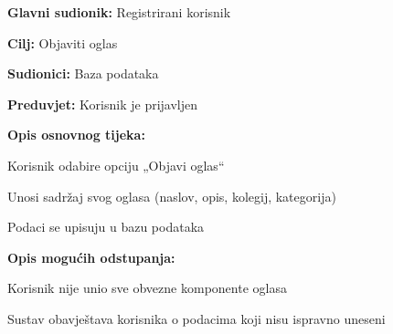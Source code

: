 				
					\noindent {}
					\begin{packed_item}
						
						\item \textbf{Glavni sudionik: }Registrirani korisnik
						\item  \textbf{Cilj:} Objaviti oglas  
						\item  \textbf{Sudionici:} Baza podataka
						\item  \textbf{Preduvjet:} Korisnik je prijavljen
						\item  \textbf{Opis osnovnog tijeka:}
						
						\item[] \begin{packed_enum}
							\item Korisnik odabire opciju „Objavi oglas“
							\item Unosi sadržaj svog oglasa (naslov, opis, kolegij, kategorija) 
							\item Podaci se upisuju u bazu podataka
						\end{packed_enum}
						
						\item  \textbf{Opis mogućih odstupanja:}
						
						\item[] \begin{packed_item}
							
							\item[2.a] Korisnik nije unio sve obvezne komponente oglasa
							\item[] \begin{packed_enum}
								\item Sustav obavještava korisnika o podacima koji nisu ispravno uneseni
							\end{packed_enum}
							
						\end{packed_item}
					\end{packed_item}
				
				
					
				
				
